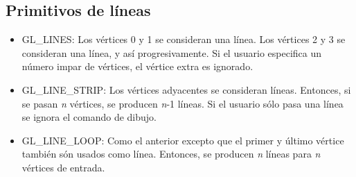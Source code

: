 \subsection{Primitivos de líneas}
\begin{itemize}
\item{GL\_LINES: Los vértices 0 y 1 se consideran una línea. Los vértices 2 y 3 se consideran una línea, y así progresivamente. Si el usuario especifica un número impar de vértices, el vértice extra es ignorado.}
\item{GL\_LINE\_STRIP: Los vértices adyacentes se consideran líneas. Entonces, si se pasan \textit{n} vértices, se producen \textit{n}-1 líneas. Si el usuario sólo pasa una línea se ignora el comando de dibujo.}
\item{GL\_LINE\_LOOP: Como el anterior excepto que el primer y último vértice también són usados como línea. Entonces, se producen \textit{n} líneas para \textit{n} vértices de entrada.}
\end{itemize}



